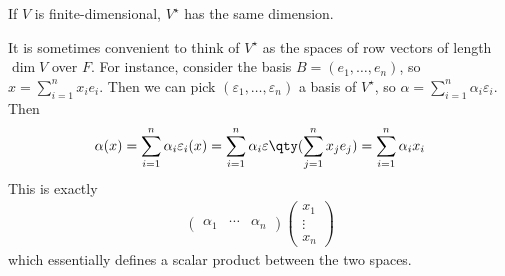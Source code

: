 \begin{corollary}
	If $V$ is finite-dimensional, $V^\star$ has the same dimension.
\end{corollary}
\begin{remark}
	It is sometimes convenient to think of $V^\star$ as the spaces of row vectors of length $\dim V$ over $F$.
	For instance, consider the basis $B = (e_1, \dots, e_n)$, so $x = \sum_{i=1}^n x_i e_i$.
	Then we can pick $(\varepsilon_1, \dots, \varepsilon_n)$ a basis of $V^\star$, so $\alpha = \sum_{i=1}^n \alpha_i \varepsilon_i$.
	Then
	\begin{align*}
		\alpha(x) = \sum_{i=1}^n \alpha_i \varepsilon_i(x) = \sum_{i=1}^n \alpha_i \varepsilon\qty(\sum_{j=1}^n x_j e_j) = \sum_{i=1}^n \alpha_i x_i
	\end{align*}
	This is exactly
	\begin{align*}
		\begin{pmatrix} \alpha_1 & \cdots & \alpha_n \end{pmatrix} \begin{pmatrix} x_1 \\ \vdots \\ x_n \end{pmatrix}
	\end{align*}
	which essentially defines a scalar product between the two spaces.
\end{remark}

